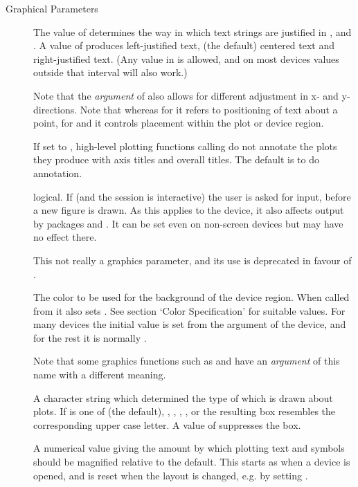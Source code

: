 %
\begin{Section}{Graphical Parameters}
\begin{description}

\item[] The value of  determines the way in
which text strings are justified in ,
 and .  A value of  produces
left-justified text,  (the default) centered text and 
right-justified text.  (Any value in \eqn{[0, 1]}{} is allowed, and
on most devices values outside that interval will also work.)

Note that the  \emph{argument} of  also
allows  for different adjustment in x- and y-
directions.  Note that whereas for  it refers to
positioning of text about a point, for  and
 it controls placement within the plot or device region.
\item[] If set to , high-level plotting
functions calling  do not annotate the
plots they produce with axis titles and overall titles.  The
default is to do annotation.
\item[] logical.  If  (and the \R{} session is
interactive) the user is asked for input, before a new figure is
drawn.  As this applies to the device, it also affects output by
packages  and .  It can be set even on
non-screen devices but may have no effect there.

This not really a graphics parameter, and its use is deprecated in
favour of .

\item[] The color to be used for the background of the
device region.  When called from  it also sets
. See section `Color Specification' for
suitable values.  For many devices the initial value is set from
the  argument of the device, and for the rest it is
normally .

Note that some graphics functions such as
 and  have an
\emph{argument} of this name with a different meaning.
\item[] A character string which determined the type of
 which is drawn about plots.  If  is
one of  (the default), , ,
, , or \code{"]"} the resulting box resembles
the corresponding upper case letter.  A value of 
suppresses the box.
\item[] A numerical value giving the amount by which
plotting text and symbols should be magnified relative to the
default.  This starts as  when a device is opened, and is
reset when the layout is changed, e.g. by setting .


\end{description}
\end{Section}
